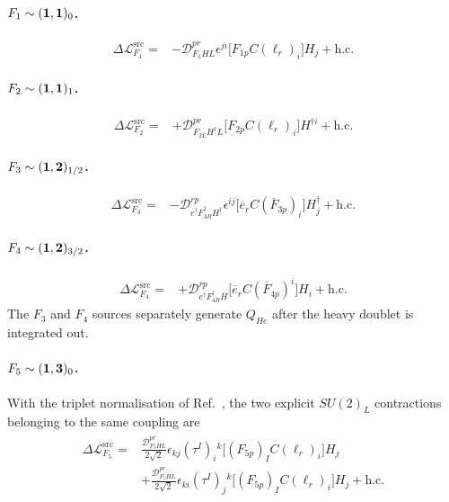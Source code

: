 \paragraph{$F_1\sim({\bf1},{\bf1})_0$.}
\begin{align}
    \Delta\mathcal L_{F_1}^{\mathrm{src}}
    ={}&-\mathcal D_{F_1HL}^{pr}\epsilon^{ji}
       \big[F_{1p}C(\ell_r)_i\big]H_j+\mathrm{h.c.}
    \label{eq:uv-lag-F1}
\end{align}

\paragraph{$F_2\sim({\bf1},{\bf1})_1$.}
\begin{align}
    \Delta\mathcal L_{F_2}^{\mathrm{src}}
    ={}&+\mathcal D_{F_{2L}H^\dagger L}^{pr}
       \big[F_{2p}C(\ell_r)_i\big]H^{\dagger i}+\mathrm{h.c.}
    \label{eq:uv-lag-F2}
\end{align}

\paragraph{$F_3\sim({\bf1},{\bf2})_{1/2}$.}
\begin{align}
    \Delta\mathcal L_{F_3}^{\mathrm{src}}
    ={}&-\mathcal D_{e^\dagger F_{3R}^\dagger H^\dagger}^{rp}
       \epsilon^{ij}\big[\overline e_r C(\overline F_{3p})_i\big]
       H_j^\dagger+\mathrm{h.c.}
    \label{eq:uv-lag-F3}
\end{align}

\paragraph{$F_4\sim({\bf1},{\bf2})_{3/2}$.}
\begin{align}
    \Delta\mathcal L_{F_4}^{\mathrm{src}}
    ={}&+\mathcal D_{e^\dagger F_{4R}^\dagger H}^{rp}
       \big[\overline e_r C(\overline F_{4p})^i\big]H_i
       +\mathrm{h.c.}
    \label{eq:uv-lag-F4}
\end{align}
The $F_3$ and $F_4$ sources separately generate $Q_{He}$ after the heavy
doublet is integrated out.

\paragraph{$F_5\sim({\bf1},{\bf3})_0$.}
With the triplet normalisation of Ref.~\cite{li2024complete}, the two explicit
$SU(2)_L$ contractions belonging to the same coupling are
\begin{align}
\begin{split}
    \Delta\mathcal L_{F_5}^{\mathrm{src}}={}&
       \frac{\mathcal D_{F_5HL}^{pr}}{2\sqrt2}
       \epsilon_{kj}(\tau^I)_i{}^k
       \big[(F_{5p})_I C(\ell_r)_i\big]H_j
       \\
      &+\frac{\mathcal D_{F_5HL}^{pr}}{2\sqrt2}
       \epsilon_{ki}(\tau^I)_j{}^k
       \big[(F_{5p})_I C(\ell_r)_i\big]H_j
       +\mathrm{h.c.}
\end{split}
\label{eq:uv-lag-F5}
\end{align}


